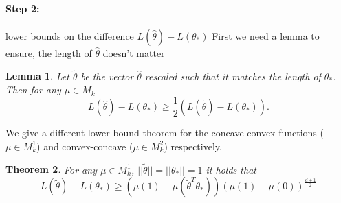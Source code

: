 \documentclass[twoside]{article} \usepackage{aistats2017}
\newtheorem{theorem}{Theorem}
\newtheorem{lemma}[theorem]{Lemma}
\begin{document}
\paragraph{Step 2:} lower bounds on the difference $L(\hat{\theta})-L(\theta_*)$
First we need a lemma to ensure, the length of $\hat{\theta}$ doesn't matter
\begin{lemma}
    Let $\tilde{\theta}$ be the vector $\hat{\theta}$ rescaled such that it matches the length of $\theta_*$. Then for any $\mu\in M_k$
    $$L(\hat{\theta})-L(\theta_*) \geq \frac{1}{2}(L(\tilde{\theta})-L(\theta_*)).$$
\end{lemma}
We give a different lower bound theorem for the concave-convex functions ($\mu\in M_k^1$) and convex-concave ($\mu\in M_k^2$) respectively.
\begin{theorem}
For any $\mu \in M_k^1$, $||\tilde{\theta}||=||\theta_*||=1$ it holds that
$$L(\tilde{\theta})-L(\theta_*) \geq (\mu(1)-\mu(\tilde{\theta}^T\theta_*))(\mu(1)-\mu(0))^{\frac{d+1}{2}}$$
\end{theorem}
\end{document}
